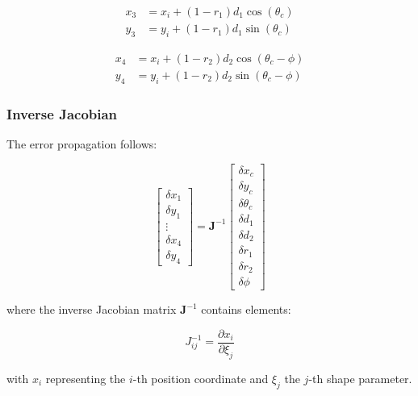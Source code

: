 \documentclass[lettersize,journal]{IEEEtran}
\begin{document}
\begin{equation}
\begin{aligned}
x_3 &= x_i + (1 - r_1) d_1 \cos(\theta_c) \\
y_3 &= y_i + (1 - r_1) d_1 \sin(\theta_c)
\end{aligned}
\end{equation}

\begin{equation}
\begin{aligned}
x_4 &= x_i + (1 - r_2) d_2 \cos(\theta_c - \phi) \\
y_4 &= y_i + (1 - r_2) d_2 \sin(\theta_c - \phi)
\end{aligned}
\end{equation}

\subsubsection{Inverse Jacobian}

The error propagation follows:

\begin{equation}
\begin{bmatrix} 
\delta x_1 \\ \delta y_1 \\ \vdots \\ \delta x_4 \\ \delta y_4 
\end{bmatrix} = 
\mathbf{J}^{-1}
\begin{bmatrix}
\delta x_c \\ \delta y_c \\ \delta \theta_c \\ \delta d_1 \\ \delta d_2 \\ \delta r_1 \\ \delta r_2 \\ \delta \phi
\end{bmatrix}
\end{equation}

where the inverse Jacobian matrix $\mathbf{J}^{-1}$ contains elements:

\begin{equation}
J^{-1}_{ij} = \frac{\partial x_i}{\partial \xi_j}
\end{equation}

with $x_i$ representing the $i$-th position coordinate and $\xi_j$ the $j$-th shape parameter.
\end{document}

